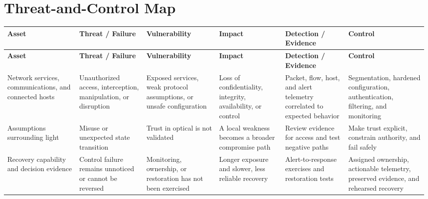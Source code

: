 \documentclass[11pt,letterpaper]{article}
\begin{document}
\section*{Threat-and-Control Map}
\begingroup\scriptsize\setlength{\tabcolsep}{2pt}
\begin{longtable}{>{\raggedright\arraybackslash}p{}>{\raggedright\arraybackslash}p{}>{\raggedright\arraybackslash}p{}>{\raggedright\arraybackslash}p{}>{\raggedright\arraybackslash}p{}>{\raggedright\arraybackslash}p{}}
\toprule\rowcolor{Navy}\color{white}\textbf{Asset} & \color{white}\textbf{Threat / Failure} & \color{white}\textbf{Vulnerability} & \color{white}\textbf{Impact} & \color{white}\textbf{Detection / Evidence} & \color{white}\textbf{Control}\\\midrule
\endfirsthead
\toprule\rowcolor{Navy}\color{white}\textbf{Asset} & \color{white}\textbf{Threat / Failure} & \color{white}\textbf{Vulnerability} & \color{white}\textbf{Impact} & \color{white}\textbf{Detection / Evidence} & \color{white}\textbf{Control}\\\midrule
\endhead
Network services, communications, and connected hosts & Unauthorized access, interception, manipulation, or disruption & Exposed services, weak protocol assumptions, or unsafe configuration & Loss of confidentiality, integrity, availability, or control & Packet, flow, host, and alert telemetry correlated to expected behavior & Segmentation, hardened configuration, authentication, filtering, and monitoring\\\midrule
Assumptions surrounding light & Misuse or unexpected state transition & Trust in optical is not validated & A local weakness becomes a broader compromise path & Review evidence for access and test negative paths & Make trust explicit, constrain authority, and fail safely\\\midrule
Recovery capability and decision evidence & Control failure remains unnoticed or cannot be reversed & Monitoring, ownership, or restoration has not been exercised & Longer exposure and slower, less reliable recovery & Alert-to-response exercises and restoration tests & Assigned ownership, actionable telemetry, preserved evidence, and rehearsed recovery\\\midrule
\bottomrule
\end{longtable}
\endgroup
\end{document}
